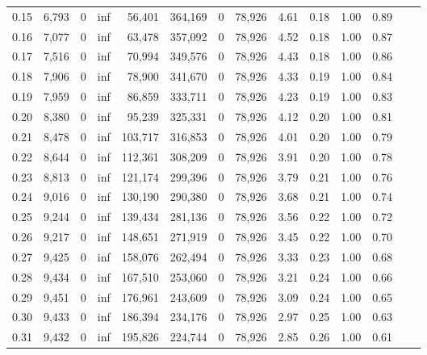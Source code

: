 \begin{tabular}{rrrrrrrrrrrrrr}
0.15 &  6,793 &      0 &      inf &   56,401 &  364,169 &       0 &  78,926 &  4.61 &  0.18 &  1.00 &      0.89 \\
0.16 &  7,077 &      0 &      inf &   63,478 &  357,092 &       0 &  78,926 &  4.52 &  0.18 &  1.00 &      0.87 \\
0.17 &  7,516 &      0 &      inf &   70,994 &  349,576 &       0 &  78,926 &  4.43 &  0.18 &  1.00 &      0.86 \\
0.18 &  7,906 &      0 &      inf &   78,900 &  341,670 &       0 &  78,926 &  4.33 &  0.19 &  1.00 &      0.84 \\
0.19 &  7,959 &      0 &      inf &   86,859 &  333,711 &       0 &  78,926 &  4.23 &  0.19 &  1.00 &      0.83 \\
0.20 &  8,380 &      0 &      inf &   95,239 &  325,331 &       0 &  78,926 &  4.12 &  0.20 &  1.00 &      0.81 \\
0.21 &  8,478 &      0 &      inf &  103,717 &  316,853 &       0 &  78,926 &  4.01 &  0.20 &  1.00 &      0.79 \\
0.22 &  8,644 &      0 &      inf &  112,361 &  308,209 &       0 &  78,926 &  3.91 &  0.20 &  1.00 &      0.78 \\
0.23 &  8,813 &      0 &      inf &  121,174 &  299,396 &       0 &  78,926 &  3.79 &  0.21 &  1.00 &      0.76 \\
0.24 &  9,016 &      0 &      inf &  130,190 &  290,380 &       0 &  78,926 &  3.68 &  0.21 &  1.00 &      0.74 \\
0.25 &  9,244 &      0 &      inf &  139,434 &  281,136 &       0 &  78,926 &  3.56 &  0.22 &  1.00 &      0.72 \\
0.26 &  9,217 &      0 &      inf &  148,651 &  271,919 &       0 &  78,926 &  3.45 &  0.22 &  1.00 &      0.70 \\
0.27 &  9,425 &      0 &      inf &  158,076 &  262,494 &       0 &  78,926 &  3.33 &  0.23 &  1.00 &      0.68 \\
0.28 &  9,434 &      0 &      inf &  167,510 &  253,060 &       0 &  78,926 &  3.21 &  0.24 &  1.00 &      0.66 \\
0.29 &  9,451 &      0 &      inf &  176,961 &  243,609 &       0 &  78,926 &  3.09 &  0.24 &  1.00 &      0.65 \\
0.30 &  9,433 &      0 &      inf &  186,394 &  234,176 &       0 &  78,926 &  2.97 &  0.25 &  1.00 &      0.63 \\
0.31 &  9,432 &      0 &      inf &  195,826 &  224,744 &       0 &  78,926 &  2.85 &  0.26 &  1.00 &      0.61 \\

\end{tabular}

